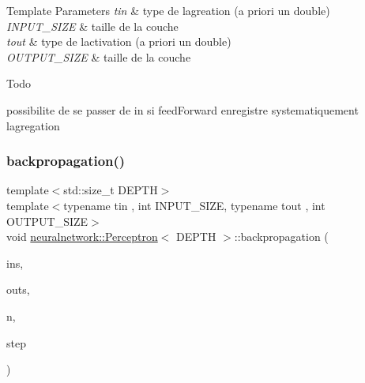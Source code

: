 \begin{DoxyTemplParams}{Template Parameters}
{\em tin} & type de l\textquotesingle{}agreation (a priori un double) \\
\hline
{\em I\+N\+P\+U\+T\+\_\+\+S\+I\+ZE} & taille de la couche \\
\hline
{\em tout} & type de l\textquotesingle{}activation (a priori un double) \\
\hline
{\em O\+U\+T\+P\+U\+T\+\_\+\+S\+I\+ZE} & taille de la couche \\
\hline
\end{DoxyTemplParams}
\begin{DoxyRefDesc}{Todo}
\item[\mbox{\hyperlink{todo__todo000001}{Todo}}]possibilite de se passer de in si feed\+Forward enregistre systematiquement l\textquotesingle{}agregation \end{DoxyRefDesc}
\mbox{\label{classneuralnetwork_1_1_perceptron_a3aef48d797fceda980d1cbf63ba62eff}} 
\subsubsection{\texorpdfstring{backpropagation()}{backpropagation()}}
{\footnotesize\ttfamily template$<$std\+::size\+\_\+t D\+E\+P\+TH$>$ \\
template$<$typename tin , int I\+N\+P\+U\+T\+\_\+\+S\+I\+ZE, typename tout , int O\+U\+T\+P\+U\+T\+\_\+\+S\+I\+ZE$>$ \\
void \mbox{\hyperlink{classneuralnetwork_1_1_perceptron}{neuralnetwork\+::\+Perceptron}}$<$ D\+E\+P\+TH $>$\+::backpropagation (\begin{DoxyParamCaption}\item[{\mbox{\hyperlink{_perceptron_8hpp_a1df3992453d71de615dab4ca5eadba8d}{neuralnetwork\+::\+In\+Out}}$<$ tin, I\+N\+P\+U\+T\+\_\+\+S\+I\+ZE $>$ $\ast$}]{ins,  }\item[{\mbox{\hyperlink{_perceptron_8hpp_a1df3992453d71de615dab4ca5eadba8d}{neuralnetwork\+::\+In\+Out}}$<$ tout, O\+U\+T\+P\+U\+T\+\_\+\+S\+I\+ZE $>$ $\ast$}]{outs,  }\item[{std\+::size\+\_\+t}]{n,  }\item[{double}]{step }\end{DoxyParamCaption})}




